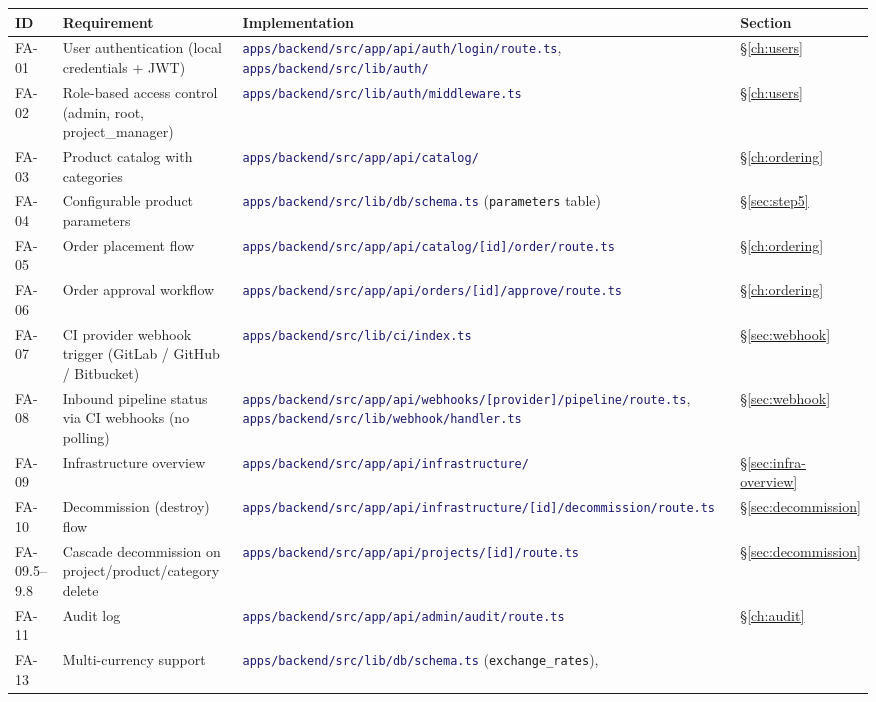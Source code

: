 \documentclass[12pt,a4paper,twoside]{report}
\newcommand{\code}[1]{\texttt{#1}}
\newcommand{\file}[1]{\texttt{\textcolor{MidnightBlue}{#1}}}
\begin{document}
\begin{landscape}
\begin{longtable}{@{}lL{5.5cm}L{9.0cm}l@{}}
  \toprule
  \textbf{ID} & \textbf{Requirement} & \textbf{Implementation} & \textbf{Section} \\
  \midrule
  \endhead
  FA-01 & User authentication (local credentials + JWT) &
    \file{apps/backend/src/app/api/auth/login/route.ts},
    \file{apps/backend/src/lib/auth/} &
    \S\ref{ch:users} \\
  FA-02 & Role-based access control (admin, root, project\_manager) &
    \file{apps/backend/src/lib/auth/middleware.ts} &
    \S\ref{ch:users} \\
  FA-03 & Product catalog with categories &
    \file{apps/backend/src/app/api/catalog/} &
    \S\ref{ch:ordering} \\
  FA-04 & Configurable product parameters &
    \file{apps/backend/src/lib/db/schema.ts} (\code{parameters} table) &
    \S\ref{sec:step5} \\
  FA-05 & Order placement flow &
    \file{apps/backend/src/app/api/catalog/[id]/order/route.ts} &
    \S\ref{ch:ordering} \\
  FA-06 & Order approval workflow &
    \file{apps/backend/src/app/api/orders/[id]/approve/route.ts} &
    \S\ref{ch:ordering} \\
  FA-07 & CI provider webhook trigger (GitLab / GitHub / Bitbucket) &
    \file{apps/backend/src/lib/ci/index.ts} &
    \S\ref{sec:webhook} \\
  FA-08 & Inbound pipeline status via CI webhooks (no polling) &
    \file{apps/backend/src/app/api/webhooks/[provider]/pipeline/route.ts},
    \file{apps/backend/src/lib/webhook/handler.ts} &
    \S\ref{sec:webhook} \\
  FA-09 & Infrastructure overview &
    \file{apps/backend/src/app/api/infrastructure/} &
    \S\ref{sec:infra-overview} \\
  FA-10 & Decommission (destroy) flow &
    \file{apps/backend/src/app/api/infrastructure/[id]/decommission/route.ts} &
    \S\ref{sec:decommission} \\
  FA-09.5--9.8 & Cascade decommission on project/product/category delete &
    \file{apps/backend/src/app/api/projects/[id]/route.ts} &
    \S\ref{sec:decommission} \\
  FA-11 & Audit log &
    \file{apps/backend/src/app/api/admin/audit/route.ts} &
    \S\ref{ch:audit} \\
  FA-13 & Multi-currency support &
    \file{apps/backend/src/lib/db/schema.ts} (\code{exchange\_rates}),

\end{longtable}
\end{landscape}
\end{document}
